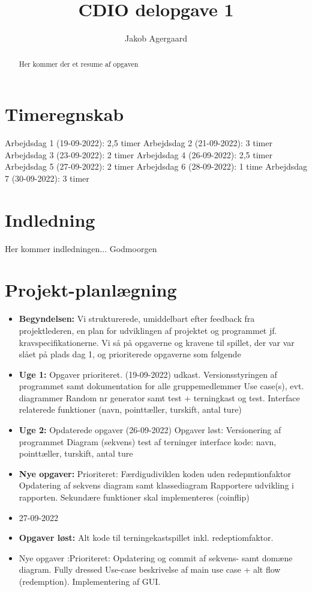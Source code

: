 \documentclass{article}
\title{CDIO delopgave 1}
\author{Jakob Agergaard}
\begin{document}


\normalsize
\begin{abstract}
     Her kommer der et resume af opgaven
\end{abstract}

\tableofcontents

\section{Timeregnskab}
Arbejdsdag 1 (19-09-2022): 2,5 timer
Arbejdsdag 2 (21-09-2022): 3 timer
Arbejdsdag 3 (23-09-2022): 2 timer
Arbejdsdag 4 (26-09-2022): 2,5 timer
Arbejdsdag 5 (27-09-2022): 2 timer
Arbejdsdag 6 (28-09-2022): 1 time
Arbejdsdag 7 (30-09-2022): 3 timer
\section{Indledning}

Her kommer indledningen...
Godmoorgen

\section{Projekt-planlægning}
\begin {itemize}
\item [\textbf{Begyndelsen:}]Vi strukturerede, umiddelbart efter feedback fra projektlederen, en plan for udviklingen af projektet og programmet jf. kravspecifikationerne. Vi så på opgaverne og kravene til spillet, der var var slået på plads dag 1, og prioriterede opgaverne som følgende
 \item [\textbf{Uge 1:}]
 Opgaver prioriteret. (19-09-2022) udkast.
Versionsstyringen af programmet samt dokumentation for alle gruppemedlemmer
Use case(s), evt. diagrammer
Random nr generator samt test + terningkast og test.
Interface relaterede funktioner (navn, pointtæller, turskift, antal ture)
\item [\textbf{Uge 2:}]
Opdaterede opgaver (26-09-2022)
Opgaver løst:
Versionering af programmet
Diagram (sekvens)
test af terninger
interface kode: navn, pointtæller, turskift, antal ture
\item [\textbf{Nye opgaver:}]
Prioriteret:
Færdigudiviklen koden uden redepmtionfaktor
Opdatering af sekvens diagram samt klassediagram
Rapportere udvikling i rapporten.
Sekundære funktioner skal implementeres (coinflip)
\item 27-09-2022
\item [\textbf{Opgaver løst:}] Alt kode til terningekastspillet inkl. redeptiomfaktor.
\item [Nye opgaver]:Prioriteret: Opdatering og commit af sekvens- samt domæne diagram. Fully dressed Use-case beskrivelse af main use case + alt flow (redemption). Implementering af GUI.
\end {itemize}
\end{document}
